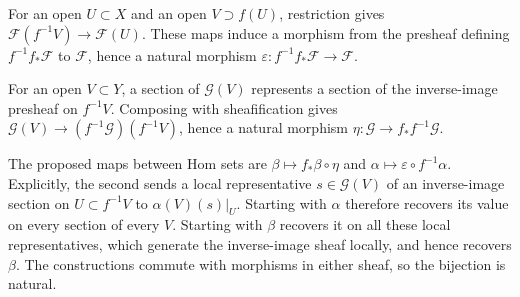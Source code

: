 For an open $U\subset X$ and an open $V\supset f(U)$, restriction gives $\mathscr F(f^{-1}V)\to\mathscr F(U)$. These maps induce a morphism from the presheaf defining $f^{-1}f_*\mathscr F$ to $\mathscr F$, hence a natural morphism $\varepsilon:f^{-1}f_*\mathscr F\to\mathscr F$.

For an open $V\subset Y$, a section of $\mathscr G(V)$ represents a section of the inverse-image presheaf on $f^{-1}V$. Composing with sheafification gives $\mathscr G(V)\to(f^{-1}\mathscr G)(f^{-1}V)$, hence a natural morphism $\eta:\mathscr G\to f_*f^{-1}\mathscr G$.

The proposed maps between Hom sets are $\beta\mapsto f_*\beta\circ\eta$ and $\alpha\mapsto\varepsilon\circ f^{-1}\alpha$. Explicitly, the second sends a local representative $s\in\mathscr G(V)$ of an inverse-image section on $U\subset f^{-1}V$ to $\alpha(V)(s)|_U$. Starting with $\alpha$ therefore recovers its value on every section of every $V$. Starting with $\beta$ recovers it on all these local representatives, which generate the inverse-image sheaf locally, and hence recovers $\beta$. The constructions commute with morphisms in either sheaf, so the bijection is natural.
